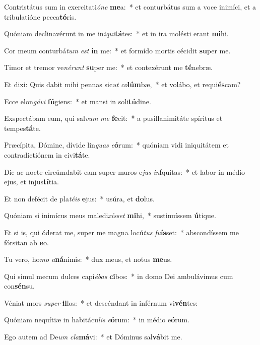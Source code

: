 \item Contristátus sum in exercitati\textit{ó}\textit{ne} \textbf{me}a:~* et conturbátus sum a voce inimíci, et a tribulatióne pecca\textbf{tó}ris.
\item Quóniam declinavérunt in me in\textit{i}\textit{qui}\textbf{tá}tes:~* et in ira molésti erant \textbf{mi}hi.
\item Cor meum conturbá\textit{tum} \textit{est} \textbf{in} me:~* et formído mortis cécidit \textbf{su}per me.
\item Timor et tremor ve\textit{né}\textit{runt} \textbf{su}per me:~* et contexérunt me \textbf{té}nebræ.
\item Et dixi: Quis dabit mihi pennas sic\textit{ut} \textit{co}\textbf{lúm}bæ,~* et volábo, et requi\textbf{és}cam?
\item Ecce elon\textit{gá}\textit{vi} \textbf{fú}giens:~* et mansi in soli\textbf{tú}dine.
\item Exspectábam eum, qui sal\textit{vum} \textit{me} \textbf{fe}cit:~* a pusillanimitáte spíritus et tempes\textbf{tá}te.
\item Præcípita, Dómine, dívide lin\textit{guas} \textit{e}\textbf{ó}rum:~* quóniam vidi iniquitátem et contradictiónem in civi\textbf{tá}te.
\item Die ac nocte circúmdabit eam super muros e\textit{jus} \textit{in}\textbf{í}quitas:~* et labor in médio ejus, et injus\textbf{tí}tia.
\item Et non defécit de pla\textit{té}\textit{is} \textbf{e}jus:~* usúra, et \textbf{do}lus.
\item Quóniam si inimícus meus maledi\textit{xís}\textit{set} \textbf{mi}hi,~* sustinuíssem \textbf{ú}tique.
\item Et si is, qui óderat me, super me magna locú\textit{tus} \textit{fu}\textbf{ís}set:~* abscondíssem me fórsitan ab \textbf{e}o.
\item Tu vero, ho\textit{mo} \textit{u}\textbf{ná}nimis:~* dux meus, et notus \textbf{me}us.
\item Qui simul mecum dulces capi\textit{é}\textit{bas} \textbf{ci}bos:~* in domo Dei ambulávimus cum con\textbf{sén}su.
\item Véniat mors \textit{su}\textit{per} \textbf{il}los:~* et descéndant in inférnum vi\textbf{vén}tes:
\item Quóniam nequítiæ in habitácu\textit{lis} \textit{e}\textbf{ó}rum:~* in médio e\textbf{ó}rum.
\item Ego autem ad De\textit{um} \textit{cla}\textbf{má}vi:~* et Dóminus sal\textbf{vá}bit me.
